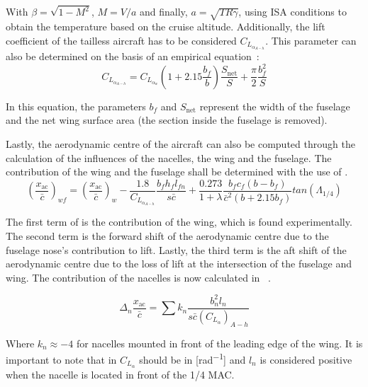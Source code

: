 With $\beta = \sqrt{1-M^2}$, $M = V/a$ and finally, $a = \sqrt{TR\gamma}$, using ISA conditions to obtain the temperature based on the cruise altitude.
Additionally, the lift coefficient of the tailless aircraft has to be considered $C_{L_{\alpha_{A-h}}}$.
This parameter can also be determined on the basis of an empirical equation~\cite{torenbeek_1982}:
\begin{equation}
    \label{eq:C_l_alpha_A-h}
    C_{L_{\alpha_{A-h}}} = C_{L_{\alpha_w}}\left(1+2.15\frac{b_f}{b}\right)\frac{S_\text{net}}{S}+\frac{\pi}{2}\frac{b_f^2}{S}
\end{equation}

In this equation, the parameters $b_f$ and $S_\text{net}$ represent the width of the fuselage and the net wing surface area (the section inside the fuselage is removed).

Lastly, the aerodynamic centre of the aircraft can also be computed through the calculation of the influences of the nacelles, the wing and the fuselage.
The contribution of the wing and the fuselage shall be determined with the use of .
\begin{equation}
    \label{eq:x_ac_wf}
    \left(\frac{x_\text{ac}}{\bar{c}}\right)_{wf} = \left(\frac{x_\text{ac}}{\bar{c}}\right)_w-\frac{1.8}{C_{L_{\alpha_{A-h}}}}\frac{b_fh_fl_{fn}}{s\bar{c}}+\frac{0.273}{1+\lambda}\frac{b_fc_f\left(b-b_f\right)}{\bar{c}^2\left(b+2.15b_f\right)}tan\left(\Lambda_{1/4}\right)
\end{equation}

The first term of  is the contribution of the wing, which is found experimentally\cite{torenbeek_1982}.
The second term is the forward shift of the aerodynamic centre due to the fuselage nose’s contribution to lift.
Lastly, the third term is the aft shift of the aerodynamic centre due to the loss of lift at the intersection of the fuselage and wing.
The contribution of the nacelles is now calculated in ~\cite{torenbeek_1982}.

\begin{equation}
    \label{eq:ac_nacelles}
    \Delta_n\frac{x_\text{ac}}{\bar{c}} = \sum{k_n}\frac{b_n^2l_n}{s\bar{c}\left(C_{L_{\alpha}}\right)_{A-h}}
\end{equation}

Where $k_n \approx -4$ for nacelles mounted in front of the leading edge of the wing.
It is important to note that in  $C_{L_{\alpha}}$ should be in [\unit{rad^{-1}}] and $l_n$ is considered positive when the nacelle is located in front of the 1/4 MAC.

